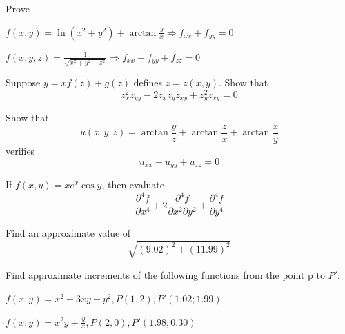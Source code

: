 \documentclass[11pt]{amsbook}
\begin{document}
    \begin{hEnumerateArabic}

        \setcounter{enumi}{18}
        \item{Prove}
            \begin{hEnumerateAlpha}
                \item $f(x,y) = \ln{(x^2 + y^2)} + \arctan {\frac{y}{x}} \Rightarrow f_{xx} + f_{yy} = 0$
                \item $f(x,y,z) = \frac{1}{\sqrt{x^2 + y^2 + z^2}} \Rightarrow f_{xx} + f_{yy} + f_{zz} = 0$
            \end{hEnumerateAlpha}

        \item{Suppose $y = xf(z) + g(z)$ defines $z = z(x, y)$. Show that }
        $$
            z_{x}^2 z_{yy} - 2 z_{x} z_{y} z_{xy} + z_{y}^2 z_{xy} = 0
        $$
        \item{Show that}
        $$
            u(x, y, z) = \arctan{\frac{y}{z}} +\arctan{\frac{z}{x}} +\arctan{\frac{x}{y}}
        $$
        verifies
        $$
            u_{xx} + u_{yy} + u_{zz} = 0
        $$
        \item{If $f(x, y) = x e^x \cos{y}$, then evaluate}
        $$
            \frac{\partial^4 f}{\partial x^4} + 2\frac{\partial^4 f}{\partial x^2 \partial y^2} +\frac{\partial^4 f}{\partial y^4}
        $$
        \item{Find an approximate value of}
        $$
            \sqrt{(9.02)^2 + (11.99)^2}
        $$
        \item{Find approximate increments of the following functions from
the point p to $P':$}
            \begin{hEnumerateAlpha}
                \item $f(x, y) = x^2 + 3xy - y^2, P (1, 2), P'(1.02; 1.99)$
                \item $f(x, y) = x^{2}y + \frac{y}{x}, P (2, 0), P'(1.98; 0.30)$
            \end{hEnumerateAlpha}
            

\end{hEnumerateArabic}
\end{document}
